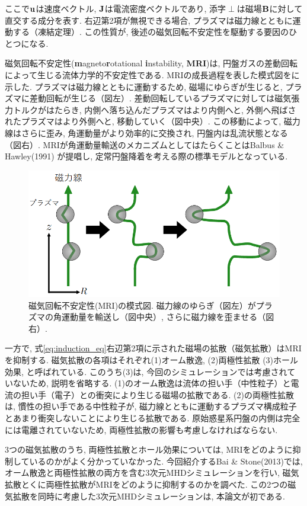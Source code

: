 \documentclass[a4paper,10pt,oneside,twocolumn,notitlepage,final,dvipdfmx]{jarticle}
\begin{document}
ここで$\vb{u}$は速度ベクトル, \( \vb{J} \)は電流密度ベクトルであり, 添字$\perp$は磁場$\vb{B}$に対して直交する成分を表す. 右辺第2項が無視できる場合, プラズマは磁力線とともに運動する（凍結定理）. この性質が, 後述の磁気回転不安定性を駆動する要因のひとつになる. 
\par
磁気回転不安定性(\textbf{m}agneto\textbf{r}otational \textbf{i}nstability, \textbf{MRI})は, 円盤ガスの差動回転によって生じる流体力学的不安定性である. MRIの成長過程を表した模式図をに示した. プラズマは磁力線とともに運動するため, 磁場にゆらぎが生じると, プラズマに差動回転が生じる（図左）. 差動回転しているプラズマに対しては磁気張力トルクがはたらき, 内側へ落ち込んだプラズマはより内側へと, 外側へ飛ばされたプラズマはより外側へと, 移動していく（図中央）. この移動によって, 磁力線はさらに歪み, 角運動量がより効率的に交換され, 円盤内は乱流状態となる（図右）. MRIが角運動量輸送のメカニズムとしてはたらくことはBalbus \& Hawley(1991) が提唱し, 定常円盤降着を考える際の標準モデルとなっている\cite{balbusPowerfulLocalShear1991}. 
\begin{figure}
  \centering
  \includegraphics[width=0.9\linewidth]{./contents/MRI.png}
  \caption{磁気回転不安定性(MRI)の模式図. 磁力線のゆらぎ（図左）がプラズマの角運動量を輸送し（図中央）, さらに磁力線を歪ませる（図右）. }\label{fig:MRI}
 \end{figure}
\par
一方で, 式\eqref{eq:induction_eq}右辺第2項に示された磁場の拡散（磁気拡散）はMRIを抑制する. 磁気拡散の各項はそれぞれ(1)オーム散逸, (2)両極性拡散 (3)ホール効果, と呼ばれている. このうち(3)は, 今回のシミュレーションでは考慮されていないため, 説明を省略する. (1)のオーム散逸は流体の担い手（中性粒子）と電流の担い手（電子）との衝突により生じる磁場の拡散である. (2)の両極性拡散は, 慣性の担い手である中性粒子が, 磁力線とともに運動するプラズマ構成粒子とあまり衝突しないことにより生じる拡散である. 原始惑星系円盤の内側は完全には電離されていないため, 両極性拡散の影響も考慮しなければならない. 
\par
3つの磁気拡散のうち, 両極性拡散とホール効果については, MRIをどのように抑制しているのかがよく分かっていなかった. 今回紹介するBai \& Stone(2013)では, オーム散逸と両極性拡散の両方を含む3次元MHDシミュレーションを行い, 磁気拡散とくに両極性拡散がMRIをどのように抑制するのかを調べた. この2つの磁気拡散を同時に考慮した3次元MHDシミュレーションは, 本論文が初である.  
\end{document}
